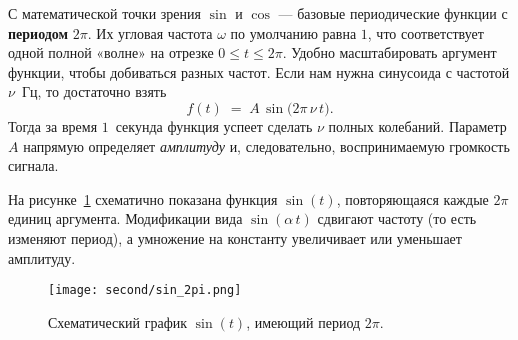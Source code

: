 \documentclass[bachelor, och, diploma]{SCWorks}
\begin{document}
С математической точки зрения \(\sin\) и \(\cos\) — базовые периодические функции с \textbf{периодом} \(2\pi\). Их угловая частота \(\omega\) по умолчанию равна \(1\), что соответствует одной полной «волне» на отрезке \(0 \le t \le 2\pi\). Удобно масштабировать аргумент функции, чтобы добиваться разных частот. Если нам нужна синусоида с частотой \(\nu\)~Гц, то достаточно взять
\[
   f(t) \;=\; A\,\sin\bigl(2\pi\,\nu \,t\bigr).
\]
Тогда за время \(1\)~секунда функция успеет сделать \(\nu\) полных колебаний. Параметр \(A\) напрямую определяет \textit{амплитуду} и, следовательно, воспринимаемую громкость сигнала.

На рисунке~\ref{fig:sin_2pi} схематично показана функция \(\sin(t)\), повторяющаяся каждые \(2\pi\) единиц аргумента. Модификации вида \(\sin(\alpha \, t)\) сдвигают частоту (то есть изменяют период), а умножение на константу увеличивает или уменьшает амплитуду.

\begin{figure}[h!]
\centering
\texttt{[image: second/sin\_2pi.png]}
\caption{Схематический график \(\sin(t)\), имеющий период \(2\pi\).}
\label{fig:sin_2pi}
\end{figure}



\end{document}
